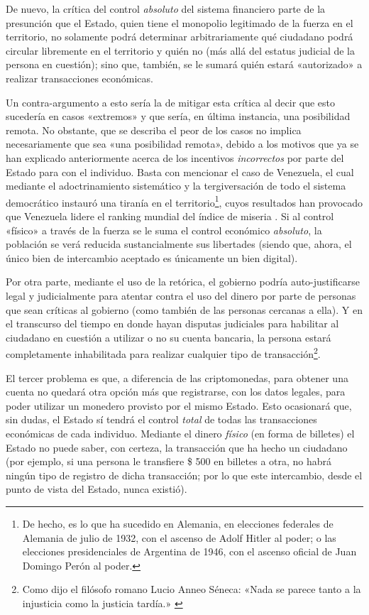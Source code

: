 \documentclass[12pt,a4paper,twoside]{book}
\begin{document}
De nuevo, la crítica del control \textit{absoluto} del sistema financiero parte de la presunción que el Estado, quien tiene el monopolio legitimado de la fuerza en el territorio, no solamente podrá determinar arbitrariamente qué ciudadano podrá circular libremente en el territorio y quién no (más allá del estatus judicial de la persona en cuestión); sino que, también, se le sumará quién estará «autorizado» a realizar transacciones económicas.

Un contra-argumento a esto sería la de mitigar esta crítica al decir que esto sucedería en casos «extremos» y que sería, en última instancia, una posibilidad remota. No obstante, que se describa el peor de los casos no implica necesariamente que sea «una posibilidad remota», debido a los motivos que ya se han explicado anteriormente acerca de los incentivos \textit{incorrectos} por parte del Estado para con el individuo. Basta con mencionar el caso de Venezuela, el cual mediante el adoctrinamiento sistemático y la tergiversación de todo el sistema democrático instauró una tiranía en el territorio\footnote{De hecho, es lo que ha sucedido en Alemania, en elecciones federales de Alemania de julio de 1932, con el ascenso de Adolf Hitler al poder; o las elecciones presidenciales de Argentina de 1946, con el ascenso oficial de Juan Domingo Perón al poder.}, cuyos resultados han provocado que Venezuela lidere el ranking mundial del índice de miseria \cite{misery:index}. Si al control «físico» a través de la fuerza se le suma el control económico \textit{absoluto}, la población se verá reducida sustancialmente sus libertades (siendo que, ahora, el único bien de intercambio aceptado es únicamente un bien digital).

Por otra parte, mediante el uso de la retórica, el gobierno podría auto-justificarse legal y judicialmente para atentar contra el uso del dinero por parte de personas que sean críticas al gobierno (como también de las personas cercanas a ella). Y en el transcurso del tiempo en donde hayan disputas judiciales para habilitar al ciudadano en cuestión a utilizar o no su cuenta bancaria, la persona estará completamente inhabilitada para realizar cualquier tipo de transacción\footnote{Como dijo el filósofo romano Lucio Anneo Séneca: «Nada se parece tanto a la injusticia como la justicia tardía.» \cite[pág. 168]{frase:seneca}}.

El tercer problema es que, a diferencia de las criptomonedas, para obtener una cuenta no quedará otra opción más que registrarse, con los datos legales, para poder utilizar un monedero provisto por el mismo Estado. Esto ocasionará que, sin dudas, el Estado sí tendrá el control \textit{total} de todas las transacciones económicas de cada individuo. Mediante el dinero \textit{físico} (en forma de billetes) el Estado no puede saber, con certeza, la transacción que ha hecho un ciudadano (por ejemplo, si una persona le transfiere \$ 500 en billetes a otra, no habrá ningún tipo de registro de dicha transacción; por lo que este intercambio, desde el punto de vista del Estado, nunca existió).
\end{document}
